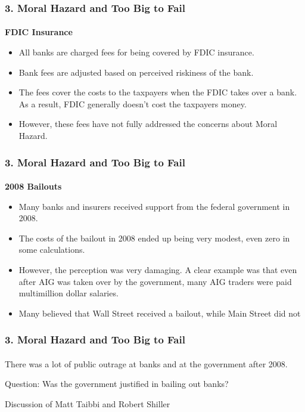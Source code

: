 \documentclass{beamer}
\begin{document}
\begin{frame}[t]
\frametitle{3. Moral Hazard and Too Big to Fail}
\framesubtitle{}

    \textbf{FDIC Insurance}
    
    \begin{itemize}
        \item All banks are charged fees for being covered by FDIC insurance.
        \item Bank fees are adjusted based on perceived riskiness of the bank.
        \item The fees cover the costs to the taxpayers when the FDIC takes over a bank.   As a result, FDIC generally doesn’t cost the taxpayers money.
        \item However, these fees have not fully addressed the concerns about Moral Hazard.
    \end{itemize}

\end{frame}

\begin{frame}[t]
\frametitle{3. Moral Hazard and Too Big to Fail}
\framesubtitle{}

    \textbf{2008 Bailouts}
    \begin{itemize}
        \item Many banks and insurers received support from the federal government in 2008.
        \item The costs of the bailout in 2008 ended up being very modest, even zero in some calculations.
        \item However, the perception was very damaging.   A clear example was that even after AIG was taken over by the government, many AIG traders were paid multimillion dollar salaries.
        \item Many believed that Wall Street received a bailout, while Main Street did not
    \end{itemize}

\end{frame}

\begin{frame}[t]
\frametitle{3. Moral Hazard and Too Big to Fail}
\framesubtitle{}

    There was a lot of public outrage at banks and at the government after 2008.  
    \vspace{1em}
    
    Question: Was the government justified in bailing out banks?
    \vspace{1em}
    
    Discussion of Matt Taibbi and Robert Shiller
    \vspace{1em}

\end{frame}
\end{document}
